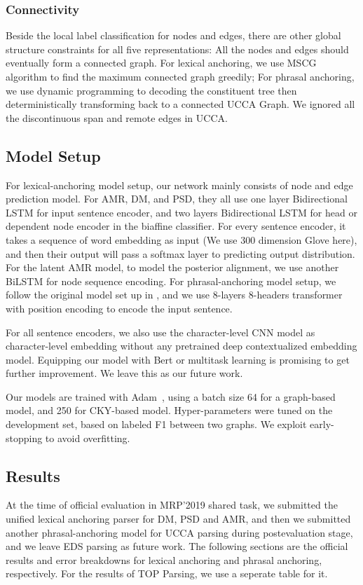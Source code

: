 \subsubsection{Connectivity}
\label{sssec:lex:connectivity}

Beside the local label classification for nodes and edges, there are
other global structure constraints for all five representations: All the nodes and
edges should eventually form a connected graph. For lexical anchoring,
we use MSCG algorithm to find the maximum connected graph greedily;
For phrasal anchoring, we use dynamic programming to decoding the
constituent tree then deterministically transforming back to a
connected UCCA Graph. We ignored all the discontinuous span and remote
edges in UCCA.

\subsection{Model Setup}
\label{ssec:exp_setup}

For lexical-anchoring model setup, our network mainly consists of node
and edge prediction model. For AMR, DM, and PSD, they all use one
layer Bidirectional LSTM for input sentence encoder, and two layers
Bidirectional LSTM for head or dependent node encoder in the
biaffine classifier. For every sentence encoder, it takes a sequence
of word embedding as input (We use 300 dimension Glove here), and then
their output will pass a softmax layer to predicting output
distribution. For the latent AMR model, to model the posterior
alignment, we use another BiLSTM for node sequence encoding. For
phrasal-anchoring model setup, we follow the original model set up in
\citet{kitaev2018constituency}, and we use 8-layers 8-headers
transformer with position encoding to encode the input sentence.

For all sentence encoders, we also use the character-level CNN model
as character-level embedding without any pretrained deep
contextualized embedding model. Equipping our model with Bert or
multitask learning is promising to get further improvement. We leave
this as our future work.

Our models are trained with Adam~\cite{kingma2014adam}, using a batch
size 64 for a graph-based model, and 250 for CKY-based
model. Hyper-parameters were tuned on the development set, based on
labeled F1 between two graphs. We exploit early-stopping to avoid
overfitting.

\subsection{Results}
\label{ssec:results}
At the time of official evaluation in MRP'2019 shared task, we
submitted the unified lexical anchoring parser for DM, PSD and AMR,
and then we submitted another phrasal-anchoring model for UCCA parsing
during postevaluation stage, and we leave EDS parsing as future
work. The following sections are the official results and error
breakdowns for lexical anchoring and phrasal anchoring, respectively. For the results of TOP Parsing, we use a seperate table
for it.

